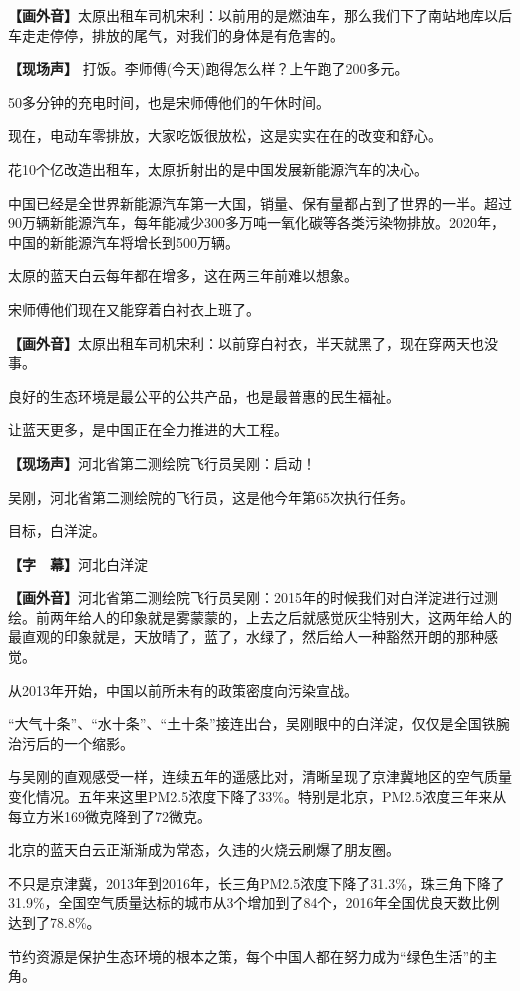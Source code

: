 \documentclass{ctexart}
\newcommand{\zkh}[1]{\textbf{\hspace{-2.7em} 【#1】}}
\begin{document}
 \zkh{画外音}太原出租车司机宋利：以前用的是燃油车，那么我们下了南站地库以后车走走停停，排放的尾气，对我们的身体是有危害的。

 \zkh{现场声} 打饭。\quad 李师傅(今天)跑得怎么样？\quad 上午跑了200多元。

 50多分钟的充电时间，也是宋师傅他们的午休时间。

 现在，电动车零排放，大家吃饭很放松，这是实实在在的改变和舒心。

 花10个亿改造出租车，太原折射出的是中国发展新能源汽车的决心。

中国已经是全世界新能源汽车第一大国，销量、保有量都占到了世界的一半。超过90万辆新能源汽车，每年能减少300多万吨一氧化碳等各类污染物排放。2020年，中国的新能源汽车将增长到500万辆。

 太原的蓝天白云每年都在增多，这在两三年前难以想象。

 宋师傅他们现在又能穿着白衬衣上班了。

 \zkh{画外音}太原出租车司机宋利：以前穿白衬衣，半天就黑了，现在穿两天也没事。

 良好的生态环境是最公平的公共产品，也是最普惠的民生福祉。

 让蓝天更多，是中国正在全力推进的大工程。

 \zkh{现场声}河北省第二测绘院飞行员吴刚：启动！

 吴刚，河北省第二测绘院的飞行员，这是他今年第65次执行任务。

 目标，白洋淀。

 \zkh{字　幕}河北白洋淀

 \zkh{画外音}河北省第二测绘院飞行员吴刚：2015年的时候我们对白洋淀进行过测绘。前两年给人的印象就是雾蒙蒙的，上去之后就感觉灰尘特别大，这两年给人的最直观的印象就是，天放晴了，蓝了，水绿了，然后给人一种豁然开朗的那种感觉。

 从2013年开始，中国以前所未有的政策密度向污染宣战。

``大气十条''、``水十条''、``土十条''接连出台，吴刚眼中的白洋淀，仅仅是全国铁腕治污后的一个缩影。

与吴刚的直观感受一样，连续五年的遥感比对，清晰呈现了京津冀地区的空气质量变化情况。五年来这里PM2.5浓度下降了33{\%}。特别是北京，PM2.5浓度三年来从每立方米169微克降到了72微克。

 北京的蓝天白云正渐渐成为常态，久违的火烧云刷爆了朋友圈。

不只是京津冀，2013年到2016年，长三角PM2.5浓度下降了31.3{\%}，珠三角下降了31.9{\%}，全国空气质量达标的城市从3个增加到了84个，2016年全国优良天数比例达到了78.8{\%}。

节约资源是保护生态环境的根本之策，每个中国人都在努力成为``绿色生活''的主角。
\end{document}
